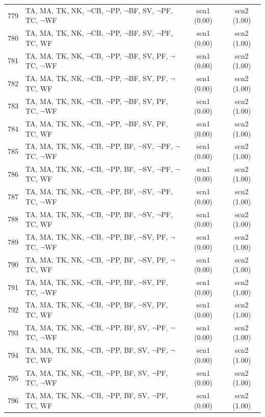 \documentclass[12pt]{article}
\begin{document}
\begin{longtable}{|l|l|c|c|}
779 & TA, MA, TK, NK, $\neg$CB, $\neg$PP, $\neg$BF, SV, $\neg$PF, TC, $\neg$WF & scn1 (0.00) & scn2 (1.00)\\
780 & TA, MA, TK, NK, $\neg$CB, $\neg$PP, $\neg$BF, SV, $\neg$PF, TC, WF & scn1 (0.00) & scn2 (1.00)\\
781 & TA, MA, TK, NK, $\neg$CB, $\neg$PP, $\neg$BF, SV, PF, $\neg$TC, $\neg$WF & scn1 (0.00) & scn2 (1.00)\\
782 & TA, MA, TK, NK, $\neg$CB, $\neg$PP, $\neg$BF, SV, PF, $\neg$TC, WF & scn1 (0.00) & scn2 (1.00)\\
783 & TA, MA, TK, NK, $\neg$CB, $\neg$PP, $\neg$BF, SV, PF, TC, $\neg$WF & scn1 (0.00) & scn2 (1.00)\\
784 & TA, MA, TK, NK, $\neg$CB, $\neg$PP, $\neg$BF, SV, PF, TC, WF & scn1 (0.00) & scn2 (1.00)\\
785 & TA, MA, TK, NK, $\neg$CB, $\neg$PP, BF, $\neg$SV, $\neg$PF, $\neg$TC, $\neg$WF & scn1 (0.00) & scn2 (1.00)\\
786 & TA, MA, TK, NK, $\neg$CB, $\neg$PP, BF, $\neg$SV, $\neg$PF, $\neg$TC, WF & scn1 (0.00) & scn2 (1.00)\\
787 & TA, MA, TK, NK, $\neg$CB, $\neg$PP, BF, $\neg$SV, $\neg$PF, TC, $\neg$WF & scn1 (0.00) & scn2 (1.00)\\
788 & TA, MA, TK, NK, $\neg$CB, $\neg$PP, BF, $\neg$SV, $\neg$PF, TC, WF & scn1 (0.00) & scn2 (1.00)\\
789 & TA, MA, TK, NK, $\neg$CB, $\neg$PP, BF, $\neg$SV, PF, $\neg$TC, $\neg$WF & scn1 (0.00) & scn2 (1.00)\\
790 & TA, MA, TK, NK, $\neg$CB, $\neg$PP, BF, $\neg$SV, PF, $\neg$TC, WF & scn1 (0.00) & scn2 (1.00)\\
791 & TA, MA, TK, NK, $\neg$CB, $\neg$PP, BF, $\neg$SV, PF, TC, $\neg$WF & scn1 (0.00) & scn2 (1.00)\\
792 & TA, MA, TK, NK, $\neg$CB, $\neg$PP, BF, $\neg$SV, PF, TC, WF & scn1 (0.00) & scn2 (1.00)\\
793 & TA, MA, TK, NK, $\neg$CB, $\neg$PP, BF, SV, $\neg$PF, $\neg$TC, $\neg$WF & scn1 (0.00) & scn2 (1.00)\\
794 & TA, MA, TK, NK, $\neg$CB, $\neg$PP, BF, SV, $\neg$PF, $\neg$TC, WF & scn1 (0.00) & scn2 (1.00)\\
795 & TA, MA, TK, NK, $\neg$CB, $\neg$PP, BF, SV, $\neg$PF, TC, $\neg$WF & scn1 (0.00) & scn2 (1.00)\\
796 & TA, MA, TK, NK, $\neg$CB, $\neg$PP, BF, SV, $\neg$PF, TC, WF & scn1 (0.00) & scn2 (1.00)\\

\end{longtable}
\end{document}
